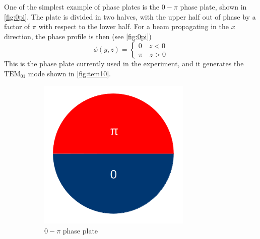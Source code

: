 One of the simplest example of phase plates is the $0-\pi$ phase plate, shown in \cref{fig:0pi}. The plate is divided in two halves, with the upper half out of phase by a factor of $\pi$ with respect to the lower half. For a beam propagating in the $x$ direction, the phase profile is then (see \cref{fig:0pi})
\begin{equation}
    \phi(y,z) =
    \begin{cases}
        0 \quad z < 0 \\
        \pi \quad z > 0
    \end{cases}
\end{equation}
This is the phase plate currently used in the experiment, and it generates the $\text{TEM}_{01}$ mode shown in \cref{fig:tem10}.

\begin{figure}
    \begin{subfigure}[t]{0.4\textwidth}
        \centering
        \includegraphics[width=0.8\textwidth, valign=c]{chapters/chapter_2/figures/0pi}
        \caption{$0-\pi$ phase plate}
        \label{fig:0pi_plate}
    \end{subfigure}
    \hfill
    \begin{subfigure}[t]{0.6\textwidth}
        \centering

\end{subfigure}
\end{figure}
